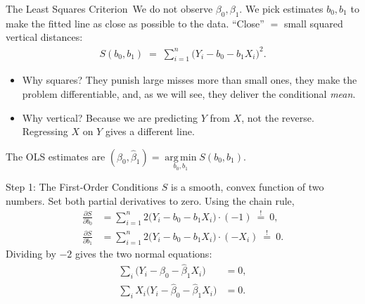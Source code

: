 \documentclass[aspectratio=169,11pt,xcolor=dvipsnames]{beamer}
\DeclareMathOperator*{\argminop}{arg\,min}
\newcommand{\argmin}{\argminop\limits}
\newcommand{\core}{\,\raisebox{0.6pt}{\textcolor{corestar}{$\bigstar$}}}
\begin{document}
\begin{frame}{The Least Squares Criterion\core}
We do not observe $\beta_0,\beta_1$. We pick estimates $b_0, b_1$ to make the
fitted line as close as possible to the data. ``Close'' $=$ small squared
vertical distances:
\begin{align*}
  S(b_0, b_1) \;=\; \sum_{i=1}^{n}\big(Y_i - b_0 - b_1 X_i\big)^2 .
\end{align*}
\pause
\begin{itemize}\itemsep4pt
  \item Why squares? They punish large misses more than small ones, they make the
        problem differentiable, and, as we will see, they deliver the
        conditional \emph{mean}.
  \item Why vertical? Because we are predicting $Y$ from $X$, not the reverse.
        Regressing $X$ on $Y$ gives a different line.
\end{itemize}
\vskip4pt
The OLS estimates are $(\hat\beta_0, \hat\beta_1) = \argmin_{b_0,b_1} S(b_0,b_1)$.
\end{frame}

\begin{frame}{Step 1: The First-Order Conditions}
$S$ is a smooth, convex function of two numbers. Set both partial derivatives to
zero. Using the chain rule,
\begin{align*}
  \frac{\partial S}{\partial b_0}
  &= \sum_{i=1}^n 2\big(Y_i - b_0 - b_1X_i\big)\cdot(-1)
  \ \overset{!}{=}\ 0 ,\\[4pt]
  \frac{\partial S}{\partial b_1}
  &= \sum_{i=1}^n 2\big(Y_i - b_0 - b_1X_i\big)\cdot(-X_i)
  \ \overset{!}{=}\ 0 .
\end{align*}
Dividing by $-2$ gives the two \alert{normal equations}:
\begin{align*}
  \sum_i \big(Y_i - \hat\beta_0 - \hat\beta_1 X_i\big) &= 0 , \tag{N1}\\
  \sum_i X_i\big(Y_i - \hat\beta_0 - \hat\beta_1 X_i\big) &= 0 . \tag{N2}
\end{align*}
\end{frame}
\end{document}
